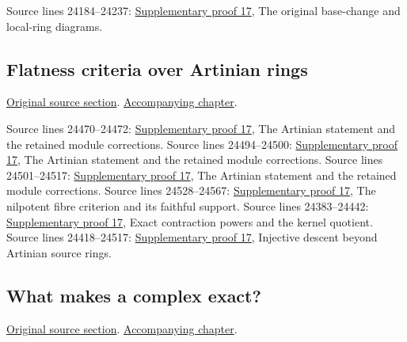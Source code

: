 \begin{AlgebraSourceRoutes}
 Source lines 24184--24237: \hyperlink{algebra_nilpotent_flatness_notes_20260928}{Supplementary proof 17}, The original base-change and local-ring diagrams.
\end{AlgebraSourceRoutes}

\subsection{Flatness criteria over Artinian rings}
\hypertarget{algebra-source-section-flatness-artinian}{}
\noindent\href{https://github.com/stacks/stacks-project/blob/a04446e57ec1fbc252a871afcec7752fb2807b14/algebra.tex\#L24286}{Original source section}. \href{algebra.pdf\#nameddest=section-flatness-artinian}{Accompanying chapter}.

\begin{AlgebraSourceRoutes}
 Source lines 24470--24472: \hyperlink{algebra_nilpotent_flatness_notes_20260928}{Supplementary proof 17}, The Artinian statement and the retained module corrections.
 Source lines 24494--24500: \hyperlink{algebra_nilpotent_flatness_notes_20260928}{Supplementary proof 17}, The Artinian statement and the retained module corrections.
 Source lines 24501--24517: \hyperlink{algebra_nilpotent_flatness_notes_20260928}{Supplementary proof 17}, The Artinian statement and the retained module corrections.
 Source lines 24528--24567: \hyperlink{algebra_nilpotent_flatness_notes_20260928}{Supplementary proof 17}, The nilpotent fibre criterion and its faithful support.
 Source lines 24383--24442: \hyperlink{algebra_nilpotent_flatness_notes_20260928}{Supplementary proof 17}, Exact contraction powers and the kernel quotient.
 Source lines 24418--24517: \hyperlink{algebra_nilpotent_flatness_notes_20260928}{Supplementary proof 17}, Injective descent beyond Artinian source rings.
\end{AlgebraSourceRoutes}

\subsection{What makes a complex exact?}
\hypertarget{algebra-source-section-complex-exact}{}
\noindent\href{https://github.com/stacks/stacks-project/blob/a04446e57ec1fbc252a871afcec7752fb2807b14/algebra.tex\#L24576}{Original source section}. \href{algebra.pdf\#nameddest=section-complex-exact}{Accompanying chapter}.

